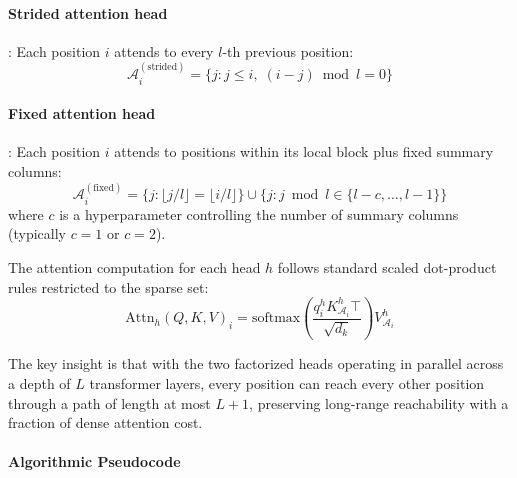 \paragraph{Strided attention head}: Each position $i$ attends to every $l$-th previous position:
\[
\mathcal{A}_i^{(\text{strided})} = \{j : j \leq i,\; (i - j) \bmod l = 0\}
\]

\paragraph{Fixed attention head}: Each position $i$ attends to positions within its local block plus fixed summary columns:
\[
\mathcal{A}_i^{(\text{fixed})} = \{j : \lfloor j/l \rfloor = \lfloor i/l \rfloor\} \cup \{j : j \bmod l \in \{l-c, \ldots, l-1\}\}
\]
where $c$ is a hyperparameter controlling the number of summary columns (typically $c=1$ or $c=2$).

The attention computation for each head $h$ follows standard scaled dot-product rules restricted to the sparse set:
\[
\text{Attn}_h(Q, K, V)_i = \text{softmax}\left(\frac{q_i^h K_{\mathcal{A}_i}^h\top}{\sqrt{d_k}}\right) V_{\mathcal{A}_i}^h
\]

The key insight is that with the two factorized heads operating in parallel across a depth of $L$ transformer layers, every position can reach every other position through a path of length at most $L + 1$, preserving long-range reachability with a fraction of dense attention cost.

\paragraph{Algorithmic Pseudocode}

